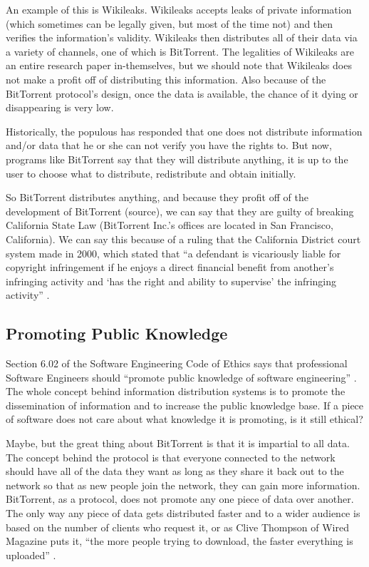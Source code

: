 \documentclass[11pt]{article}
\begin{document}
An example of this is Wikileaks. Wikileaks accepts leaks of private information (which sometimes can be legally given, but most of the time not) and then verifies the information's validity. Wikileaks then distributes all of their data via a variety of channels, one of which is BitTorrent. The legalities of Wikileaks are an entire research paper in-themselves, but we should note that Wikileaks does not make a profit off of distributing this information. Also because of the BitTorrent protocol's design, once the data is available, the chance of it dying or disappearing is very low.

Historically, the populous has responded that one does not distribute information and/or data that he or she can not verify you have the rights to. But now, programs like BitTorrent say that they will distribute anything, it is up to the user to choose what to distribute, redistribute and obtain initially.

So BitTorrent distributes anything, and because they profit off of the development of BitTorrent (source), we can say that they are guilty of breaking California State Law (BitTorrent Inc.'s offices are located in San Francisco, California). We can say this because of a ruling that the California District court system made in 2000, which stated that ``a defendant is vicariously liable for copyright infringement if he enjoys a direct financial benefit from another's infringing activity and `has the right and ability to supervise' the infringing activity'' \cite{2000m}.

\subsection{Promoting Public Knowledge}

Section 6.02 of the Software Engineering Code of Ethics says that professional Software Engineers should ``promote public knowledge of software engineering'' \cite[6.02]{secode}. The whole concept behind information distribution systems is to promote the dissemination of information and to increase the public knowledge base. If a piece of software does not care about what knowledge it is promoting, is it still ethical?

Maybe, but the great thing about BitTorrent is that it is impartial to all data. The concept behind the protocol is that everyone connected to the network should have all of the data they want as long as they share it back out to the network so that as new people join the network, they can gain more information. BitTorrent, as a protocol, does not promote any one piece of data over another. The only way any piece of data gets distributed faster and to a wider audience is based on the number of clients who request it, or as Clive Thompson of Wired Magazine puts it, ``the more people trying to download, the faster everything is uploaded'' \cite{wiredbt}.
\end{document}
